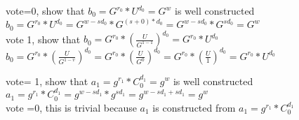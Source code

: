 \begin{infobox}[Explanation of \begin{math}b_0 = G^{r_0}*U^{d_0}\end{math}]
vote=0, show that \begin{math}b_0 = G^{r_0}*U^{d_0} = G^w \end{math} is well constructed\\
\begin{math}b_0 = G^{r_0}*U^{d_0} =  G^{w-sd_0}*G^{(s+0)*d_{0}} =  G^{w-sd_0}*G^{sd_{0}}= G^w \end{math}\\
vote 1, show that \begin{math}b_0 = G^{r_0}*(\frac{U}{G^{1-1}})^{d_0}=  G^{r_0}*U^{d_0} \end{math} \\
\begin{math}b_0 = G^{r_0}*(\frac{U}{G^{1-v}})^{d_0}=  G^{r_0}*(\frac{U}{G^{0}})^{d_0} = G^{r_0}*(\frac{U}{1})^{d_0}=  G^{r_0}*U^{d_0}  \end{math}
\end{infobox}



\begin{infobox}[Explanation of \begin{math}a_1=g^{r_1} * C^{d_1}_0\end{math}]
vote= 1, show that \begin{math}a_1=g^{r_1} * C^{d_1}_0 = g^w \end{math} is well constructed\\
\begin{math}a_1=g^{r_1} * C^{d_1}_0 = g^{w-sd_1}* g^{sd_1}= g^{w-sd_1+ sd_1}= g^w\end{math}\\
vote =0, this is trivial because \begin{math}a_1 \end{math} is constructed from \begin{math}a_1=g^{r_1} * C^{d_1}_0 \end{math}
\end{infobox}



